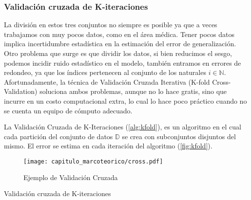 
\subsubsection{Validación cruzada de K-iteraciones}

La división en estos tres conjuntos no siempre es posible ya que a veces
trabajamos con muy pocos datos, como en el área médica. Tener pocos datos
implica incertidumbre estadística en la estimación del error de generalización.
Otro problema que surge es que dividir los datos, si bien reducimos el sesgo,
podemos incidir ruido estadístico en el modelo, también entramos en errores de
redondeo, ya que los índices pertenecen al conjunto de los naturales \(i \in
\mathbb{N}\). Afortunadamente, la técnica de Validación Cruzada Iterativa
(K-fold Cross-Validation) soluciona ambos problemas, aunque no lo hace gratis,
sino que incurre en un costo computacional extra, lo cual lo hace poco práctico
cuando no se cuenta un equipo de cómputo adecuado.~\cite{Hastie2009}

La Validación Cruzada de K-Iteraciones (\autoref{alg:kfold}), es un algoritmo en
el cual cada partición del conjunto de datos \(\mathbb{D}\) se crea con
subconjuntos disjuntos del mismo. El error se estima en cada iteración del
algoritmo (\autoref{fig:kfold}).~\cite{Goodfellow2016}

\begin{figure}[H]
    \centering
    \texttt{[image: capitulo\_marcoteorico/cross.pdf]}
    \caption{Ejemplo de Validación Cruzada}\label{fig:kfold}
\end{figure}

\begin{algorithm}[H]
    \SetAlgoLined
    \BlankLine
    \BlankLine
    \BlankLine
    \BlankLine
    \BlankLine
    \BlankLine
    \caption{Validación cruzada de K-iteraciones}\label{alg:kfold}
\end{algorithm}


